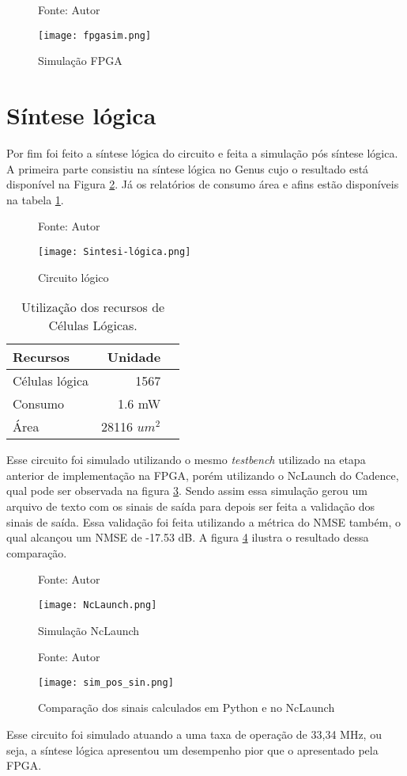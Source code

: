 \begin{figure}[htbp!]
	\centering
	\captionsetup{justification=centering}
	\caption*{Fonte: Autor}
	\texttt{[image: fpgasim.png]}
	\caption{Simulação FPGA}
	\label{fig:simfpga}
\end{figure}


\section{Síntese lógica}
Por fim foi feito a síntese lógica do circuito e feita a simulação pós síntese lógica. A primeira parte consistiu na síntese lógica no Genus cujo o resultado está disponível na Figura \ref{fig:circuito_logico}. Já os relatórios de consumo área e afins estão disponíveis na tabela \ref{tab:recursos_sintese}. 

\begin{figure}[htbp!]
	\centering
	\captionsetup{justification=centering}
	\caption*{Fonte: Autor}
	\texttt{[image: Sintesi-lógica.png]}
	\caption{Circuito lógico}
	\label{fig:circuito_logico}
\end{figure}

\begin{table}[htbp!]
	\centering
	\begin{tabular}{|l|r|r|}
		\hline
		Recursos & Unidade  \\
		\hline
        Células lógica & 1567  \\
		Consumo & 1.6 mW  \\
		Área & 28116 $um^2$  \\
		\hline
	\end{tabular}
	\caption{Utilização dos recursos de Células Lógicas.}
	\label{tab:recursos_sintese}
\end{table}

Esse circuito foi simulado utilizando o mesmo \textit{testbench} utilizado na etapa anterior de implementação na FPGA, porém utilizando o NcLaunch do Cadence, qual pode ser observada na figura \ref{fig:NcLaunch}. Sendo assim essa simulação gerou um arquivo de texto com os sinais de saída para depois ser feita a validação dos sinais de saída. Essa validação foi feita utilizando a métrica do NMSE também, o qual alcançou um NMSE de -17.53 dB. A figura \ref{fig:simpost} ilustra o resultado dessa comparação.


\begin{figure}[htbp!]
	\centering
	\captionsetup{justification=centering}
	\caption*{Fonte: Autor}
	\texttt{[image: NcLaunch.png]}
	\caption{Simulação NcLaunch}
	\label{fig:NcLaunch}
\end{figure}


\begin{figure}[htbp!]
	\centering
	\captionsetup{justification=centering}
	\caption*{Fonte: Autor}
	\texttt{[image: sim\_pos\_sin.png]}
	\caption{Comparação dos sinais calculados em Python e no NcLaunch} 
	\label{fig:simpost}
\end{figure}

Esse circuito foi simulado atuando a uma taxa de operação de 33,34 MHz, ou seja, a síntese lógica apresentou um desempenho pior que o apresentado pela FPGA. 